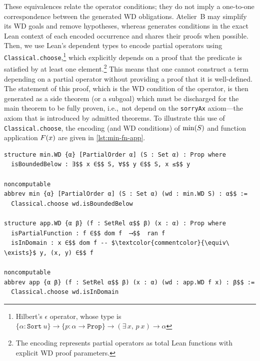 These equivalences relate the operator conditions; they do not imply a one-to-one correspondence between the generated WD obligations.
Atelier~B may simplify its WD goals and remove hypotheses, whereas \barrel generates conditions in the exact Lean context of each encoded occurrence and shares their proofs when possible.
%
Then, we use Lean's dependent types to encode partial operators using \texttt{Classical.choose},\footnote{Hilbert's $\epsilon$ operator, whose type is \mbox{$\{\alpha : \mathtt{Sort}\ u\} \to \{p : \alpha \to \mathtt{Prop}\} \to (\exists\, x,\, p\ x) \to \alpha$}} which explicitly depends on a proof that the predicate is satisfied by at least one element.\footnote{The encoding represents partial operators as total Lean functions with explicit WD proof parameters.}
This means that one cannot construct a term depending on a partial operator without providing a proof that it is well-defined.
The statement of this proof, which is the WD condition of the operator, is then generated as a side theorem (or a subgoal) which must be discharged for the main theorem to be fully proven, i.e.,\ not depend on the \texttt{sorryAx} axiom---the axiom that is introduced by admitted theorems.
To illustrate this use of \texttt{Classical.choose}, the encoding (and WD conditions) of $\operatorname{min}(S)$ and function application $F(x)$ are given in \cref{lst:min-fn-app}.

\begin{lstlisting}[language=lean, mathescape=true, label=lst:min-fn-app, caption={Encoding of the $\bmin{S}$ and $\bapp{F}{x}$ partial operators.}, float=t]
structure min.WD {α} [PartialOrder α] (S : Set α) : Prop where
  isBoundedBelow : ∃$$ x ∈$$ S, ∀$$ y ∈$$ S, x ≤$$ y

noncomputable 
abbrev min {α} [PartialOrder α] (S : Set α) (wd : min.WD S) : α$$ :=
  Classical.choose wd.isBoundedBelow

structure app.WD {α β} (f : SetRel α$$ β) (x : α) : Prop where
  isPartialFunction : f ∈$$ dom f  ⟶$$  ran f
  isInDomain : x ∈$$ dom f -- $\textcolor{commentcolor}{\equiv\ \exists}$ y, (x, y) ∈$$ f

noncomputable 
abbrev app {α β} (f : SetRel α$$ β) (x : α) (wd : app.WD f x) : β$$ :=
  Classical.choose wd.isInDomain
\end{lstlisting}

